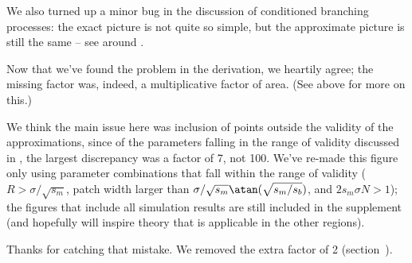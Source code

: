 We also turned up a minor bug in the discussion of conditioned branching processes:
the exact picture is not quite so simple,
but the approximate picture is still the same --
see around .



\reviewersection


\reply
Now that we've found the problem in the derivation,
we heartily agree;
the missing factor was, indeed, a multiplicative factor of area.
(See above for more on this.)



\reply
We think the main issue here was inclusion of points outside the validity of the approximations,
since of the parameters falling in the range of validity discussed in ,
the largest discrepancy was a factor of 7, not 100.
We've re-made this figure only using parameter combinations that fall within the range of validity
($R > \sigma/\sqrt{s_m}$, patch width larger than $\sigma/\sqrt{s_m} \atan(\sqrt{s_m/s_b})$, and $2 s_m \sigma N > 1$);
the figures that include all simulation results are still included in the supplement
(and hopefully will inspire theory that is applicable in the other regions).


\reply
Thanks for catching that mistake.  
We removed the extra factor of 2 (section~).



